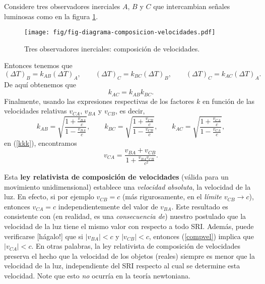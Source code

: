 Considere tres observadores inerciales $A$, $B$ y $C$ que intercambian señales
luminosas como en la figura \ref{k3}.
\begin{figure}[!h]
\centerline{\texttt{[image: fig/fig-diagrama-composicion-velocidades.pdf]}}
 \caption{Tres observadores inerciales: composición de velocidades.}
\label{k3}
\end{figure}
 Entonces tenemos que
\begin{equation}
(\Delta T)_B=k_{AB} (\Delta T)_A, \qquad (\Delta T)_C=k_{BC} (\Delta T)_B,
\qquad (\Delta T)_C=k_{AC} (\Delta T)_A.
\end{equation}
De aquí obtenemos que
\begin{equation}
k_{AC}=k_{AB}k_{BC}.\label{kkk}
\end{equation}
Finalmente, usando las expresiones respectivas de los factores $k$ en función
de las velocidades relativas $v_{CA}$, $v_{BA}$ y $v_{CB}$, es decir,
\begin{equation}
k_{AB}=\sqrt{\frac{1+\frac{v_{BA}}{c}}{1-\frac{v_{BA}}{c}}}, \qquad k_{BC}=\sqrt{\frac{1+\frac{v_{CB}}{c}}{1-\frac{v_{CB}}{c}}} , \qquad k_{AC}=\sqrt{\frac{1+\frac{v_{CA}}{c}}{1-\frac{v_{CA}}{c}}},
\end{equation}
en (\ref{kkk}), encontramos
\begin{equation}
\boxed{v_{CA}=\frac{v_{BA}+v_{CB}}{1+\frac{v_{BA}v_{CB}}{c^2}}.} \label{compvel}
\end{equation}

Esta \textbf{ley relativista de composición de velocidades} (válida para un movimiento unidimensional) establece una \textit{velocidad absoluta}, la
velocidad de la luz. En efecto, si por ejemplo $v_{CB}=c$ (más rigurosamente, en el \textit{límite} $v_{CB}\to c$), entonces $v_{CA}=c$ independientemente del valor de $v_{BA}$. Este resultado es consistente con (en realidad, es una \textit{consecuencia de}) nuestro postulado que la velocidad de la luz tiene el mismo valor con respecto a todo SRI. Además, puede verificarse [hágalo!] que si $|v_{BA}|<c$ y $|v_{CB}|<c$, entonces  (\ref{compvel}) implica que $|v_{CA}|<c$. En otras palabras, la ley relativista de composición de velocidades preserva el hecho que la velocidad de los objetos (reales) siempre es menor que la velocidad de la luz, independiente del SRI respecto al cual se determine esta velocidad. Note que esto \textit{no} ocurría en la teoría newtoniana.



